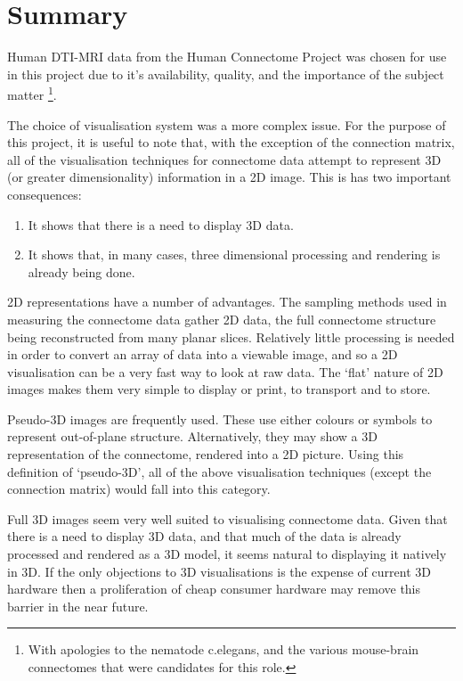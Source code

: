 \documentclass[MSc,paper=a4,pagesize=auto]{icldt}
\begin{document}
\section{Summary}
Human DTI-MRI data from the Human Connectome Project was chosen for use in this project due to it's availability, quality, and the importance of the subject matter \footnote{With apologies to the nematode c.elegans, and the various mouse-brain connectomes that were candidates for this role.}. 

The choice of visualisation system was a more complex issue. For the purpose of this project, it is useful to note that, with the exception of the connection matrix, all of the visualisation techniques for connectome data attempt to represent 3D (or greater dimensionality) information in a 2D image. This is has two important consequences:
\begin{enumerate}
\item It shows that there is a need to display 3D data.
\item It shows that, in many cases, three dimensional processing and rendering is already being done.
\end{enumerate}

2D representations have a number of advantages. The sampling methods used in measuring the connectome data gather 2D data, the full connectome structure being reconstructed from many planar slices. Relatively little processing is needed in order to convert an array of data into a viewable image, and so a 2D visualisation can be a very fast way to look at raw data. The ‘flat’ nature of 2D images makes them very simple to display or print, to transport and to store. 

Pseudo-3D images are frequently used. These use either colours or symbols to represent out-of-plane structure. Alternatively, they may show a 3D representation of the connectome, rendered into a 2D picture. Using this definition of ‘pseudo-3D’, all of the above visualisation techniques (except the connection matrix) would fall into this category. 

Full 3D images seem very well suited to visualising connectome data. Given that there is a need to display 3D data, and that much of the data is already processed and rendered as a 3D model, it seems natural to displaying it natively in 3D. If the only objections to 3D visualisations is the expense of current 3D hardware \cite{Margulies2013} then a proliferation of cheap consumer hardware may remove this barrier in the near future.
\end{document}
